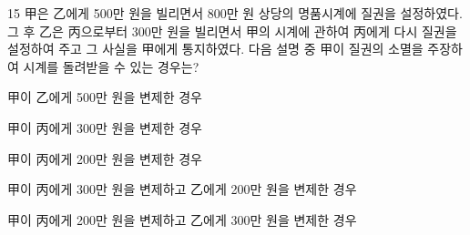 \begin{question}{15}
甲은 乙에게 500만 원을 빌리면서 800만 원 상당의 명품시계에 질권을 설정하였다. 그 후 乙은 丙으로부터 300만 원을 빌리면서 甲의 시계에 관하여 丙에게 다시 질권을 설정하여 주고 그 사실을 甲에게 통지하였다. 다음 설명 중 甲이 질권의 소멸을 주장하여 시계를 돌려받을 수 있는 경우는?
\begin{choices}
  \item 甲이 乙에게 500만 원을 변제한 경우
  \item 甲이 丙에게 300만 원을 변제한 경우
  \item 甲이 丙에게 200만 원을 변제한 경우
  \item 甲이 丙에게 300만 원을 변제하고 乙에게 200만 원을 변제한 경우
  \item 甲이 丙에게 200만 원을 변제하고 乙에게 300만 원을 변제한 경우
\end{choices}
\end{question}
